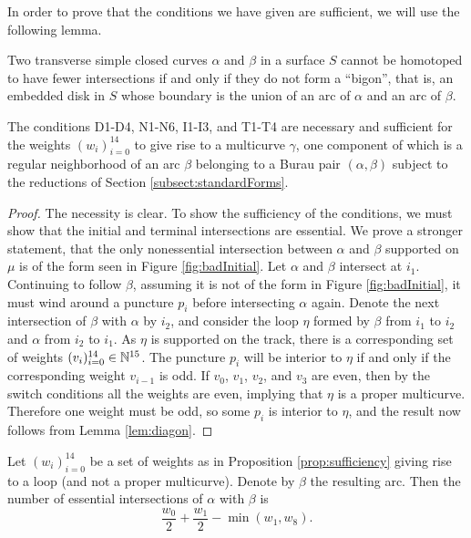 In order to prove that the conditions we have given are sufficient, we will use the following lemma.

\begin{lemma}
 \label{lem:diagon}
 Two transverse simple closed curves $\alpha$ and $\beta$ in a surface $S$ cannot be homotoped to have fewer intersections if and only if they do not form a ``bigon'', that is, an embedded disk in $S$ whose boundary is the union of an arc of $\alpha$ and an arc of $\beta$.
\end{lemma}

\begin{proposition}
 \label{prop:sufficiency}
 The conditions D1-D4, N1-N6, I1-I3, and T1-T4 are necessary and sufficient for the weights $(w_i)_{i=0}^{14}$ to give rise to a multicurve $\gamma$, one component of which is a regular neighborhood of an arc $\beta$ belonging to a Burau pair $(\alpha, \beta)$ subject to the reductions of Section \ref{subsect:standardForms}.
\end{proposition}
\begin{proof}
 The necessity is clear. To show the sufficiency of the conditions, we must show that the initial and terminal intersections are essential. We prove a stronger statement, that the only nonessential intersection between $\alpha$ and $\beta$ supported on $\mu$ is of the form seen in Figure \ref{fig:badInitial}. Let $\alpha$ and $\beta$ intersect at $i_1$. Continuing to follow $\beta$, assuming it is not of the form in Figure \ref{fig:badInitial}, it must wind around a puncture $p_i$ before intersecting $\alpha$ again. Denote the next intersection of $\beta$ with $\alpha$ by $i_2$, and consider the loop $\eta$ formed by $\beta$ from $i_1$ to $i_2$ and $\alpha$ from $i_2$ to $i_1$. As $\eta$ is supported on the track, there is a corresponding set of weights $(v_i)_{i=0}^{14} \in \mathbb{N}^{15}$. The puncture $p_i$ will be interior to $\eta$ if and only if the corresponding weight $v_{i-1}$ is odd. If $v_0$, $v_1$, $v_2$, and $v_3$ are even, then by the switch conditions all the weights are even, implying that $\eta$ is a proper multicurve. Therefore one weight must be odd, so some $p_i$ is interior to $\eta$, and the result now follows from Lemma \ref{lem:diagon}.
\end{proof}

\begin{corollary}
 \label{cor:interesectionCount}
 Let $(w_i)_{i=0}^{14}$ be a set of weights as in Proposition \ref{prop:sufficiency} giving rise to a loop (and not a proper multicurve). Denote by $\beta$ the resulting arc. Then the number of essential intersections of $\alpha$ with $\beta$ is
  $$\frac{w_0}{2} + \frac{w_1}{2} - \min(w_1, w_8).$$
\end{corollary}

